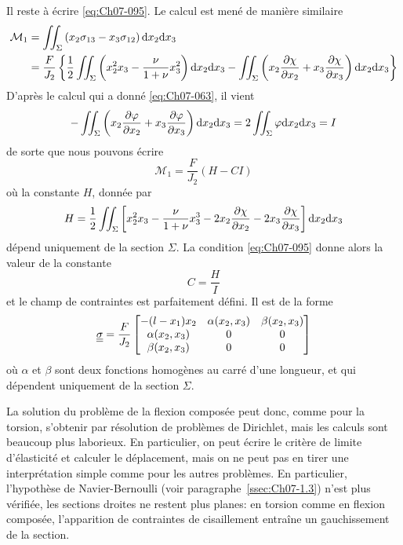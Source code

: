 Il reste à écrire \eqref{eq:Ch07-095}.
Le calcul est mené de manière similaire
\begin{align*}
    \mathcal{M}_1 &= \iint_{\Sigma} \left( x_2 \sigma_{13} - x_3 \sigma_{12} \right) \mathrm{d} x_2 \mathrm{d} x_3 \\
    &= \frac{F}{J_2} \left\{ \frac{1}{2} \iint_{\Sigma} \left( x_2^2 x_3 - \frac{\nu}{1+\nu} x_3^2 \right) \mathrm{d} x_2 \mathrm{d} x_3 - \iint_{\Sigma} \left( x_2 \frac{\partial \chi}{\partial x_2} + x_3 \frac{\partial \chi}{\partial x_3}  \right)\mathrm{d} x_2 \mathrm{d} x_3 \right\}
\end{align*}
D'après le calcul qui a donné \eqref{eq:Ch07-063}, il vient 
\begin{displaymath}
    -\iint_{\Sigma} \left( x_2 \frac{\partial \varphi}{\partial x_2} + x_3 \frac{\partial \varphi}{\partial x_3} \right) \mathrm{d} x_2 \mathrm{d} x_3 = 2 \iint_{\Sigma} \varphi \mathrm{d} x_2 \mathrm{d} x_3 = I
\end{displaymath}
de sorte que nous pouvons écrire 
\begin{equation}
    \mathcal{M}_1 = \frac{F}{J_2} \left( H - CI \right)
    \label{eq:Ch07-114}
\end{equation}
où la constante $H$, donnée par
\begin{equation}
    H = \frac{1}{2} \iint_{\Sigma} \left[ x_2^2 x_3 - \frac{\nu}{1+\nu} x_3^3 - 2x_2 \frac{\partial \chi}{\partial x_2} -2x_3 \frac{\partial \chi}{\partial x_3} \right] \mathrm{d} x_2 \mathrm{d} x_3
    \label{eq:Ch07-115}
\end{equation}
dépend uniquement de la section $\Sigma$.
La condition \eqref{eq:Ch07-095} donne alors la valeur de la constante 
\begin{equation}
    C = \frac{H}{I}
    \label{eq:Ch07-116}
\end{equation}
et le champ de contraintes est parfaitement défini.
Il est de la forme 
\begin{equation}
    \underline{\underline{\sigma}} = \frac{F}{J_2} 
    \begin{bmatrix}
        -(l-x_1) x_2 & \alpha(x_2,x_3) & \beta(x_2, x_3) \\
        \alpha(x_2,x_3) & 0 & 0 \\
        \beta(x_2,x_3) & 0 & 0
    \end{bmatrix}
    \label{eq:Ch07-117}
\end{equation}
où $\alpha$ et $\beta$ sont deux fonctions homogènes au carré d'une longueur, et qui dépendent uniquement de la section $\Sigma$.

La solution du problème de la flexion composée peut donc, comme pour la torsion, s'obtenir par résolution de problèmes de Dirichlet, mais les calculs sont beaucoup plus laborieux.
En particulier, on peut écrire le critère de limite d'élasticité et calculer le déplacement, mais on ne peut pas en tirer une interprétation simple comme pour les autres problèmes.
En particulier, l'hypothèse de Navier-Bernoulli (voir paragraphe~\ref{ssec:Ch07-1.3}) n'est plus vérifiée, les sections droites ne restent plus planes: en torsion comme en flexion composée, l'apparition de contraintes de cisaillement entraîne un gauchissement de la section.


